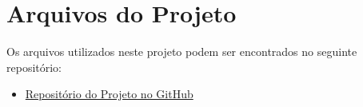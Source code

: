 \section{Arquivos do Projeto}

Os arquivos utilizados neste projeto podem ser encontrados no seguinte repositório:

\begin{itemize}
    \item \href{https://github.com/luizros/pricom/tree/main/lab_2/gnu_radio}{Repositório do Projeto no GitHub}
\end{itemize}